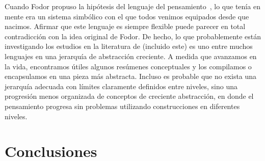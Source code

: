 Cuando Fodor propuso la hipótesis del lenguaje del pensamiento~\cite{fodor1975language}, lo que tenía en mente era un sistema simbólico con el que todos venimos equipados desde que nacimos. Afirmar que este lenguaje es siempre flexible puede parecer en total contradicción con la idea original de Fodor. De hecho, lo que probablemente están investigando los estudios en la literatura de \lot (incluido este) es uno entre muchos lenguajes en una jerarquía de abstracción creciente. A medida que avanzamos en la vida, encontramos útiles algunos resúmenes conceptuales y los compilamos o encapsulamos en una pieza más abstracta. Incluso es probable que no exista una jerarquía adecuada con límites claramente definidos entre niveles, sino una progresión menos organizada de conceptos de creciente abstracción, en donde el pensamiento progresa sin problemas utilizando construcciones en diferentes niveles.

\section{Conclusiones}

